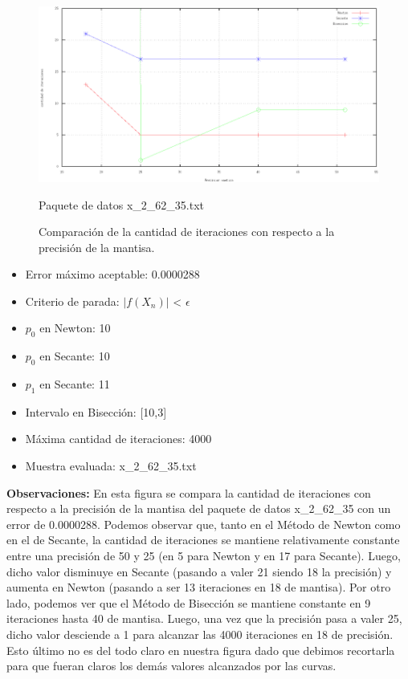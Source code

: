 \documentclass[10pt, a4paper]{article}
\begin{document}
\begin{figure}[H] %
\begin{center}
\includegraphics[width=370pt]{./cantidaditeraciones_mantisa.png}
\caption[h]{Comparaci\'on de la cantidad de iteraciones con respecto a la precisi\'on de la mantisa.}{Paquete de datos x\_2\_62\_35.txt}
\end{center}
\end{figure}

\begin{itemize}
\item Error m\'aximo aceptable: 0.0000288
\item Criterio de parada: $|f(X_{n})|$ < $\epsilon$ 
\item $p_{0}$ en Newton: 10
\item $p_{0}$ en Secante: 10
\item $p_{1}$ en Secante: 11
\item Intervalo en Bisecci\'on: [10,3]
\item M\'axima cantidad de iteraciones: 4000
\item Muestra evaluada: x\_2\_62\_35.txt
\end{itemize}

\large{\textbf{Observaciones:}}
En esta figura se compara la cantidad de iteraciones con respecto a la precisi\'on de la mantisa del paquete de datos x\_2\_62\_35 con un error de 0.0000288.\newline
Podemos observar que, tanto en el M\'etodo de Newton como en el de Secante, la cantidad de iteraciones se mantiene relativamente constante entre una precisi\'on de 50 y 25 (en 5 para Newton y en 17 para Secante). Luego, dicho valor disminuye en Secante (pasando a valer 21 siendo 18 la precisi\'on) y aumenta en Newton (pasando a ser 13 iteraciones en 18 de mantisa). Por otro lado, podemos ver que el M\'etodo de Bisecci\'on se mantiene constante en 9 iteraciones hasta 40 de mantisa. Luego, una vez que la precisi\'on pasa a valer 25, dicho valor desciende a 1 para alcanzar las 4000 iteraciones en 18 de precisi\'on. Esto \'ultimo no es del todo claro en nuestra figura dado que debimos recortarla para que fueran claros los dem\'as valores alcanzados por las curvas.
\end{document}
